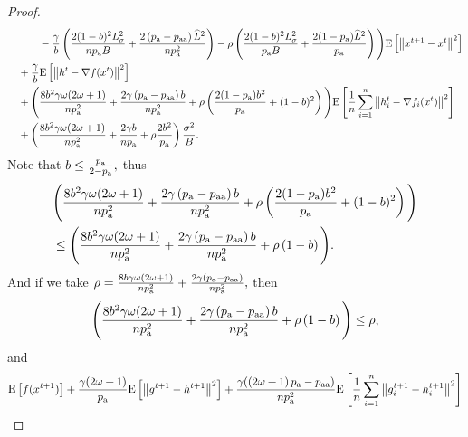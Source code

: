 \documentclass{article}
\newcommand*{\probavailable}{\ensuremath{p_{\textnormal{a}}}}
\newcommand*{\probpairaa}{\ensuremath{p_{\textnormal{aa}}}}
\begin{document}
\begin{proof}
\begin{align*}
      &\qquad\quad - \frac{\gamma}{b}\left(\frac{2 (1 - b)^2 L_{\sigma}^2}{n \probavailable B} + \frac{2\left(\probavailable - \probpairaa\right) \widehat{L}^2}{n \probavailable^2} \right) - \rho \left(\frac{2 (1 - b)^2 L_{\sigma}^2}{\probavailable B} + \frac{2(1 - \probavailable) \widehat{L}^2}{\probavailable}\right)\Bigg) \Exp{\norm{x^{t+1} - x^t}^2} \\
      &\quad + \frac{\gamma}{b} \Exp{\norm{h^{t} - \nabla f(x^{t})}^2} \\
      &\quad + \Bigg(\frac{8 b^2 \gamma \omega (2 \omega + 1)}{n \probavailable^2} + \frac{2 \gamma \left(\probavailable - \probpairaa\right) b}{n \probavailable^2} + \rho \left(\frac{2 (1 - \probavailable) b^2}{\probavailable} + (1 - b)^2\right)\Bigg)\Exp{\frac{1}{n}\sum_{i=1}^n\norm{h^{t}_i - \nabla f_i(x^{t})}^2} \\
      &\quad + \left(\frac{8 b^2 \gamma \omega (2 \omega + 1)}{n \probavailable^2} + \frac{2 \gamma b}{n \probavailable} + \rho \frac{2 b^2}{\probavailable}\right) \frac{\sigma^2}{B}.
    \end{align*}
    Note that $b \leq \frac{\probavailable}{2 - \probavailable},$ thus
    \begin{align*}
      &\Bigg(\frac{8 b^2 \gamma \omega (2 \omega + 1)}{n \probavailable^2} + \frac{2 \gamma \left(\probavailable - \probpairaa\right) b}{n \probavailable^2} + \rho \left(\frac{2 (1 - \probavailable) b^2}{\probavailable} + (1 - b)^2\right)\Bigg) \\
      &\leq \Bigg(\frac{8 b^2 \gamma \omega (2 \omega + 1)}{n \probavailable^2} + \frac{2 \gamma \left(\probavailable - \probpairaa\right) b}{n \probavailable^2} + \rho \left(1 - b\right)\Bigg).
    \end{align*}
    And if we take $\rho = \frac{8 b \gamma \omega (2 \omega + 1)}{n \probavailable^2} + \frac{2 \gamma \left(\probavailable - \probpairaa\right)}{n \probavailable^2},$ then
    \begin{align*}
      \Bigg(\frac{8 b^2 \gamma \omega (2 \omega + 1)}{n \probavailable^2} + \frac{2 \gamma \left(\probavailable - \probpairaa\right) b}{n \probavailable^2} + \rho \left(1 - b\right)\Bigg) \leq \rho,
    \end{align*}
    and 
    \begin{align*}
      &\Exp{f(x^{t + 1})} + \frac{\gamma (2 \omega + 1)}{\probavailable} \Exp{\norm{g^{t+1} - h^{t+1}}^2} + \frac{\gamma (\left(2 \omega + 1\right)\probavailable - \probpairaa)}{n \probavailable^2} \Exp{\frac{1}{n}\sum_{i=1}^n\norm{g^{t+1}_i - h^{t+1}_i}^2}\\

\end{align*}
\end{proof}
\end{document}
